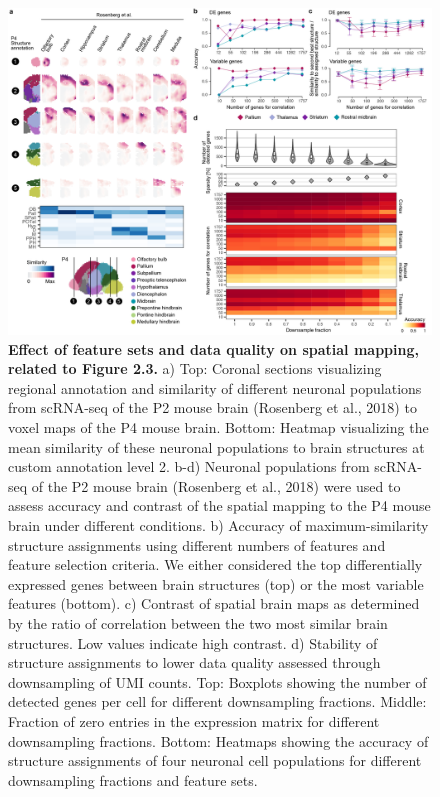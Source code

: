 \begin{figure}[h!]
    \centering
	\includegraphics[width=\textwidth]{figures/voxhunt/Supp_2}
    \caption{\textbf{Effect of feature sets and data quality on spatial mapping, related to Figure 2.3.} a) Top: Coronal sections visualizing regional annotation and similarity of different neuronal populations from scRNA-seq of the P2 mouse brain (Rosenberg et al., 2018) to voxel maps of the P4 mouse brain. Bottom: Heatmap visualizing the mean similarity of these neuronal populations to brain structures at custom annotation level 2. b-d) Neuronal populations from scRNA-seq of the P2 mouse brain (Rosenberg et al., 2018) were used to assess accuracy and contrast of the spatial mapping to the P4 mouse brain under different conditions. b) Accuracy of maximum-similarity structure assignments using different numbers of features and feature selection criteria. We either considered the top differentially expressed genes between brain structures (top) or the most variable features (bottom). c) Contrast of spatial brain maps as determined by the ratio of correlation between the two most similar brain structures. Low values indicate high contrast. d) Stability of structure assignments to lower data quality assessed through downsampling of UMI counts. Top: Boxplots showing the number of detected genes per cell for different downsampling fractions. Middle: Fraction of zero entries in the expression matrix for different downsampling fractions. Bottom: Heatmaps showing the accuracy of structure assignments of four neuronal cell populations for different downsampling fractions and feature sets.}
    \label{fig:voxS2}
\end{figure}


